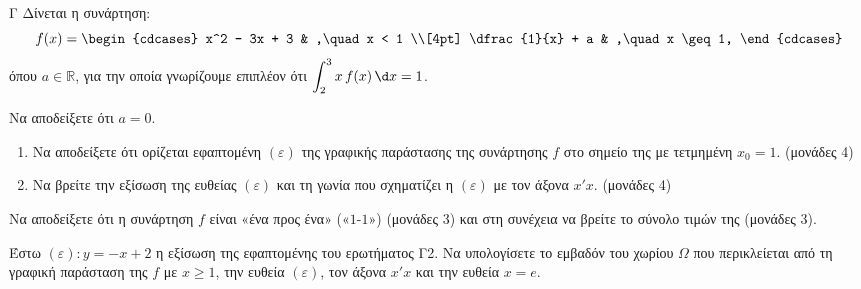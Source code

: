 \begin{thema}{Γ}
Δίνεται η συνάρτηση:
\[
f(x) =
\begin{cdcases}
x^2 - 3x + 3 & ,\quad x < 1 \\[4pt]
\dfrac{1}{x} + a & ,\quad x \geq 1,
\end{cdcases}
\]
όπου $a \in \mathbb{R}$, για την οποία γνωρίζουμε επιπλέον ότι $\displaystyle\int_2^3 x\,f(x)\,\d x = 1$.
\begin{erwthma}
    \item Να αποδείξετε ότι $a = 0$. 

    \item
    \begin{enumerate}[label=\roman*)]
        \item Να αποδείξετε ότι ορίζεται εφαπτομένη $(\varepsilon)$ της γραφικής παράστασης της συνάρτησης $f$ στο σημείο της με τετμημένη $x_0 = 1$. \hfill (μονάδες 4)
        \item Να βρείτε την εξίσωση της ευθείας $(\varepsilon)$ και τη γωνία που σχηματίζει η $(\varepsilon)$ με τον άξονα $x'x$. \hfill (μονάδες 4)
    \end{enumerate}

    \item Να αποδείξετε ότι η συνάρτηση $f$ είναι «ένα προς ένα» («$1$-$1$») (μονάδες 3) και στη συνέχεια να βρείτε το σύνολο τιμών της (μονάδες 3). 

    \item Έστω $(\varepsilon)\colon y = -x + 2$ η εξίσωση της εφαπτομένης του ερωτήματος Γ2. Να υπολογίσετε το εμβαδόν του χωρίου $\Omega$ που περικλείεται από τη γραφική παράσταση της $f$ με $x \geq 1$, την ευθεία $(\varepsilon)$, τον άξονα $x'x$ και την ευθεία $x = e$. 
\end{erwthma}
\end{thema}

